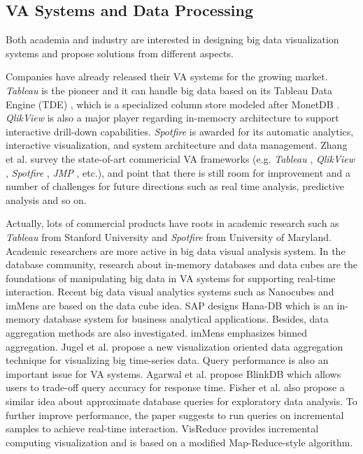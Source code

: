 \documentclass[journal]{vgtc}                %
\begin{document}
{\subsection{VA Systems and Data Processing }
Both academia and industry are interested in designing big data visualization systems and propose solutions from different aspects.

Companies have already released their VA systems for the growing market. \textit{Tableau} \cite{tab} is the pioneer and it can handle big data based on its Tableau Data Engine (TDE) \cite{Wesley}, which is a specialized column store modeled after MonetDB \cite{Boncz05monetdb}. \textit{QlikView} \cite{qlikview} is also a major player regarding in-memocry architecture to support interactive drill-down capabilities. \textit{Spotfire} \cite{spotfire} is awarded for its automatic analytics, interactive visualization, and system architecture and data management. Zhang et al. \cite{Zhang2012} survey the state-of-art commericial VA frameworks (e.g. \textit{Tableau} \cite{tab}, \textit{QlikView} \cite{qlikview}, \textit{Spotfire} \cite{spotfire}, \textit{JMP} \cite{jmp}, etc.), and point that there is still room for improvement and a number of challenges for future directions such as real time analysis, predictive analysis and so on.

Actually, lots of commercial products have roots in academic research such as \textit{Tableau} \cite{tab} from Stanford University and \textit{Spotfire} \cite{spotfire} from University of Maryland. Academic researchers are more active in big data visual analysis system. In the database community, research about in-memory databases and data cubes are the foundations of manipulating big data in VA systems for supporting real-time interaction. Recent big data visual analytics systems such as Nanocubes \cite{Lins2013} and imMens \cite{2013-immens} are based on the data cube idea. SAP designs Hana-DB \cite{farber2012sap} which is an in-memory database system for business analytical applications. Besides, data aggregation methods are also investigated. imMens \cite{2013-immens} emphasizes  binned aggregation. Jugel et al. \cite{jugel2014m4} propose a new visualization oriented data aggregation technique for visualizing big time-series data. Query performance is also an important issue for VA systems. Agarwal et al. \cite{Agarwal} propose BlinkDB which allows users to trade-off query accuracy for response time. Fisher et al. \cite{Fisher2012} also propose a similar idea about approximate database queries for exploratory data analysis. To further improve performance, the paper suggests to run queries on incremental samples to achieve real-time interaction. VisReduce \cite{im2013visreduce} provides incremental computing visualization and is based on a modified Map-Reduce-style algorithm. 


}
\end{document}
